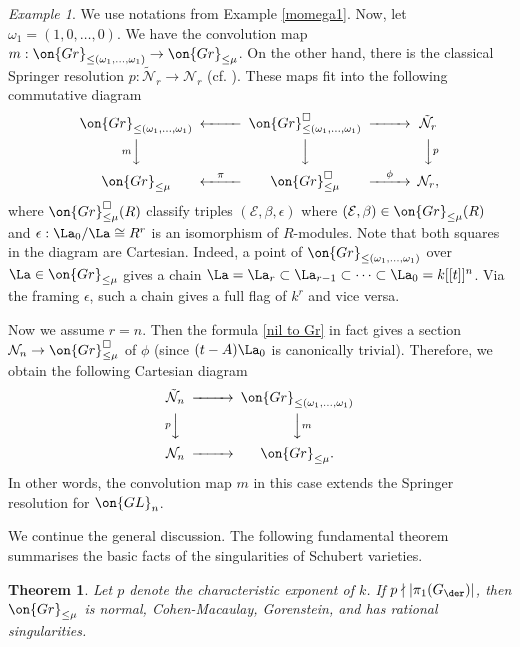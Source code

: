 \documentclass[]{pcmi}
\theoremstyle{plain}
\newtheorem{thm}[equation]{Theorem}
\theoremstyle{remark}
\newtheorem{ex}[equation]{Example}
\theoremstyle{definition}
\newcommand{\mE}{{\mathcal E}}
\newcommand{\mN}{{\mathcal N}}
\newcommand{\Gr}{{\on{Gr}}}
\newcommand{\GL}{{\on{GL}}}
\begin{document}
\begin{ex}\label{conv v.s. springer}
We use notations from Example \ref{momega1}.  Now, let $\omega_1=(1,0,\ldots,0)$. We have the convolution map $m:\Gr_{\leq(\omega_1,\ldots,\omega_1)}\to\Gr_{\leq \mu}$. On the other hand, there is the classical Springer resolution $p:\tilde \mN_r\to\mN_r$ (cf. \cite[\S~1]{Yu}). These maps fit into the following commutative diagram
\begin{equation}\label{sat and springer}
\begin{CD}
\Gr_{\leq(\omega_1,\ldots,\omega_1)}@<<< \Gr_{\leq (\omega_1,\ldots,\omega_1)}^{\square}@>>>\tilde \mN_r\\ 
 @VmVV@VVV@VVpV\\
 \Gr_{\leq \mu}@<\pi<<\Gr_{\leq \mu}^{\square}@>\phi>> \mN_r,
\end{CD}
\end{equation}
where $\Gr_{\leq \mu}^{\square}(R)$ classify triples $(\mE,\beta,\epsilon)$ where $(\mE,\beta)\in\Gr_{\leq \mu}(R)$ and $\epsilon: \La_0/\La\cong R^r$ is an isomorphism of $R$-modules. Note that both squares in the diagram are Cartesian. Indeed, a point of $\Gr_{\leq(\omega_1,\ldots,\omega_1)}$ over $\La\in \Gr_{\leq \mu}$ gives a chain $\La=\La_r\subset\La_{r-1}\subset\cdots\subset \La_0=k[[t]]^n$. Via the framing $\epsilon$, such a chain gives a full flag of $k^r$ and vice versa.

Now we assume $r=n$. Then the formula \eqref{nil to Gr} in fact gives a section $\mN_n\to \Gr_{\leq \mu}^{\square}$ of $\phi$ (since $(t-A)\La_0$ is canonically trivial). Therefore, we obtain the following Cartesian diagram
\begin{equation}\label{sat and springer2}
\begin{CD}
\tilde\mN_n@>>>\Gr_{\leq(\omega_1,\ldots,\omega_1)}\\
@VpVV@VVmV\\
\mN_n@>>>\Gr_{\leq \mu}.
\end{CD}
\end{equation}
In other words, the convolution map $m$ in this case extends the Springer resolution for $\GL_n$.
\end{ex}

We continue the general discussion. The following fundamental theorem summarises the basic facts of the singularities of Schubert varieties. 
\begin{thm}\label{singularity}
Let $p$ denote the characteristic exponent of $k$. If $p\nmid |\pi_1(G_\der)|$, then $\Gr_{\leq \mu}$ is normal, Cohen-Macaulay, Gorenstein, and has rational singularities. 
\end{thm}
\end{document}
